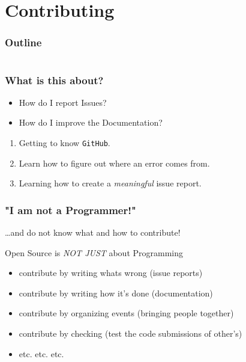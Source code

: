 \section{Contributing}

\begin{frame}
	\frametitle{Outline}
	\begin{columns}[t]
		\begin{column}{.5\textwidth}
			\tableofcontents[sections={1-9},currentsection]
		\end{column}
		\begin{column}{.5\textwidth}
			\tableofcontents[sections={10-18},currentsection]
		\end{column}
	\end{columns}
\end{frame}

\begin{frame}
	\frametitle{What is this about?}
	\begin{question}[Questions]
		\begin{itemize}
			\item How do I report Issues?
			\item How do I improve the Documentation?
		\end{itemize}
	\end{question}
	\begin{docs}[Objectives]
		\begin{enumerate}
			\item Getting to know \texttt{GitHub}.
			\item Learn how to figure out where an error comes from.
			\item Learning how to create a \emph{meaningful} issue report.
		\end{enumerate}
	\end{docs}
\end{frame}

\begin{frame}
  \frametitle{"I am not a Programmer!"}
  \ldots and do not know what and how to contribute!
  \pause
  \begin{block}{Open Source is \emph{NOT JUST} about Programming}
  	\begin{itemize}[<+->]
  		\item contribute by writing whats wrong (issue reports)
  		\item contribute by writing how it's done (documentation)
  		\item contribute by organizing events (bringing people together)
  		\item contribute by checking (test the code submissions of other's)
  		\item etc. etc. etc.
  	\end{itemize}
  \end{block} 
\end{frame}

